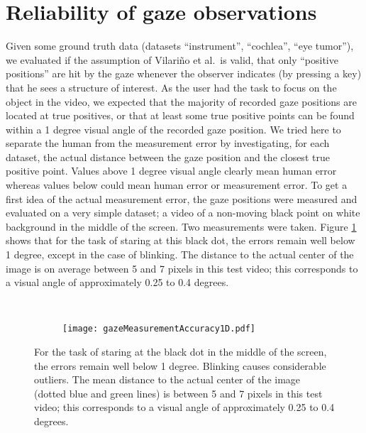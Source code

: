 \section{Reliability of gaze observations}
Given some ground truth data (datasets ``instrument'', ``cochlea'', ``eye tumor''), we evaluated if the assumption of Vilari\~no et al.\ is valid, that only ``positive positions'' are hit by the gaze whenever the observer indicates (by pressing a key) that he sees a structure of interest. 
As the user had the task to focus on the object in the video, we expected that the majority of recorded gaze positions are located at true positives, or that at least some true positive points can be found within a 1 degree visual angle of the recorded gaze position. 
We tried here to separate the human from the measurement error by investigating, for each dataset, the actual distance between the gaze position and the closest true positive point. 
Values above 1 degree visual angle clearly mean human error whereas values below could mean human error or measurement error. 
To get a first idea of the actual measurement error, the gaze positions were measured and evaluated on a very simple dataset; a video of a non-moving black point on white background in the middle of the screen. 
Two measurements were taken. Figure \ref{fig:gazeMeasurementAccuracy} shows that for the task of staring at this black dot, the errors remain well below 1 degree, except in the case of blinking. 
The distance to the actual center of the image is on average between 5 and 7 pixels in this test video; this corresponds to a visual angle of approximately 0.25 to 0.4 degrees.

\begin{figure}[ht]
	\centering
	\begin{subfigure}[h]{0.41\textwidth}
	      \setlength{\fboxsep}{0pt}%
	      \setlength{\fboxrule}{0.5pt}%
	      \centering
	\end{subfigure}
	~
	\begin{subfigure}[h]{0.48\textwidth}
		\texttt{[image: gazeMeasurementAccuracy1D.pdf]}	
	\end{subfigure}
	\caption{For the task of staring at the black dot in the middle of the screen, the errors remain well below 1 degree. Blinking causes considerable outliers. The mean distance to the actual center of the image (dotted blue and green lines) is between 5 and 7 pixels in this test video; this corresponds to a visual angle of approximately 0.25 to 0.4 degrees.}
	\label{fig:gazeMeasurementAccuracy}
\end{figure}


